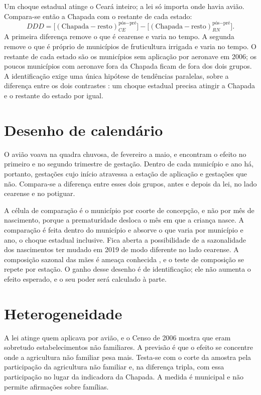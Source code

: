 Um choque estadual atinge o Ceará inteiro; a lei só importa onde havia avião.
Compara-se então a Chapada com o restante de cada estado:
\[
DDD = \big[(\text{Chapada} - \text{resto})_{CE}^{\text{pós}-\text{pré}}\big] -
      \big[(\text{Chapada} - \text{resto})_{RN}^{\text{pós}-\text{pré}}\big].
\]
A primeira diferença remove o que é cearense e varia no tempo. A segunda remove
o que é próprio de municípios de fruticultura irrigada e varia no tempo. O
restante de cada estado são os municípios sem aplicação por aeronave em 2006;
os poucos municípios com aeronave fora da Chapada ficam de fora dos dois
grupos. A identificação exige uma única hipótese de tendências paralelas, sobre
a diferença entre os dois contrastes \cite{olden2022triple}: um choque
estadual precisa atingir a Chapada e o restante do estado por igual.

\section{Desenho de calendário}
\label{sec:calendario}

O avião voava na quadra chuvosa, de fevereiro a maio, e
 encontram o efeito no primeiro e no segundo trimestre
de gestação. Dentro de cada município e ano há, portanto, gestações cujo início
atravessa a estação de aplicação e gestações que não. Compara-se a diferença
entre esses dois grupos, antes e depois da lei, no lado cearense e no potiguar.

A célula de comparação é o município por coorte de concepção, e não por mês de
nascimento, porque a prematuridade desloca o mês em que a criança nasce. A
comparação é feita dentro do município e absorve o que varia por município e
ano, o choque estadual inclusive. Fica aberta a possibilidade de a sazonalidade
dos nascimentos ter mudado em 2019 de modo diferente no lado cearense. A
composição sazonal das mães é ameaça conhecida \cite{buckles2013,
currie2013}, e o teste de composição se repete por estação. O ganho desse
desenho é de identificação; ele não aumenta o efeito esperado, e o seu poder
será calculado à parte.

\section{Heterogeneidade}

A lei atinge quem aplicava por avião, e o Censo de 2006 mostra que eram
sobretudo estabelecimentos não familiares. A previsão é que o efeito se
concentre onde a agricultura não familiar pesa mais. Testa-se com o corte da
amostra pela participação da agricultura não familiar e, na diferença tripla,
com essa participação no lugar da indicadora da Chapada. A medida é municipal e
não permite afirmações sobre famílias.

